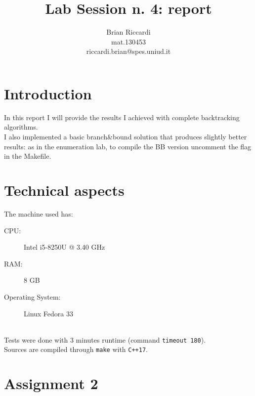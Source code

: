 \documentclass{article}
\title{Lab Session n. 4: report}
\author{Brian Riccardi \\ mat.130453 \\ riccardi.brian@spes.uniud.it}
\date{}
\begin{document}
\maketitle

\section{Introduction}
In this report I will provide the results I achieved with complete backtracking algorithms.\\
I also implemented a basic branch\&bound solution that produces slightly better results: as in
the enumeration lab, to compile the BB version uncomment the flag in the Makefile.

\section{Technical aspects}
The machine used has:

\begin{description}
    \item[CPU:] Intel i5-8250U @ 3.40 GHz
    \item[RAM:] 8 GB
    \item[Operating System:] Linux Fedora 33
\end{description}
\ \\
Tests were done with 3 minutes runtime (command \texttt{timeout 180}).\\
Sources are compiled through \texttt{make} with \texttt{C++17}.

\section{Assignment 2}
\end{document}
